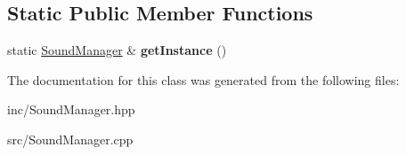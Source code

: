 \subsection*{Static Public Member Functions}
\begin{DoxyCompactItemize}
\item 
\hypertarget{class_sound_manager_a4f8f0b2d539d055f4c1de8c47d483cb3}{static \hyperlink{class_sound_manager}{Sound\+Manager} \& {\bfseries get\+Instance} ()}\label{class_sound_manager_a4f8f0b2d539d055f4c1de8c47d483cb3}

\end{DoxyCompactItemize}


The documentation for this class was generated from the following files\+:\begin{DoxyCompactItemize}
\item 
inc/Sound\+Manager.\+hpp\item 
src/Sound\+Manager.\+cpp\end{DoxyCompactItemize}
